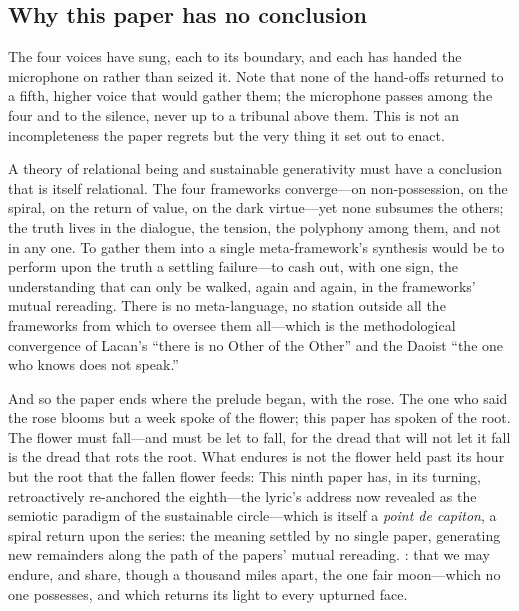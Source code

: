 \subsection{Why this paper has no conclusion}
\label{p09:sec:no-conclusion}

The four voices have sung, each to its boundary, and each has handed the microphone on rather than seized it. Note that none of the hand-offs returned to a fifth, higher voice that would gather them; the microphone passes among the four and to the silence, never up to a tribunal above them. This is not an incompleteness the paper regrets but the very thing it set out to enact.

\begin{claim}
A theory of relational being and sustainable generativity must have a conclusion that is itself relational. The four frameworks converge---on non-possession, on the spiral, on the return of value, on the dark virtue---yet none subsumes the others; the truth lives in the dialogue, the tension, the polyphony among them, and not in any one. To gather them into a single meta-framework's synthesis would be to perform upon the truth a settling failure---to cash out, with one sign, the understanding that can only be walked, again and again, in the frameworks' mutual rereading. There is no meta-language, no station outside all the frameworks from which to oversee them all---which is the methodological convergence of Lacan's ``there is no Other of the Other'' \parencite{lacan2006} and the Daoist ``the one who knows does not speak.'' 
\end{claim}

And so the paper ends where the prelude began, with the rose. The one who said the rose blooms but a week spoke of the flower; this paper has spoken of the root. The flower must fall---and must be let to fall, for the dread that will not let it fall is the dread that rots the root. What endures is not the flower held past its hour but the root that the fallen flower feeds:  This ninth paper has, in its turning, retroactively re-anchored the eighth---the lyric's address now revealed as the semiotic paradigm of the sustainable circle---which is itself a \emph{point de capiton}, a spiral return upon the series: the meaning settled by no single paper, generating new remainders along the path of the papers' mutual rereading. : that we may endure, and share, though a thousand miles apart, the one fair moon---which no one possesses, and which returns its light to every upturned face.
